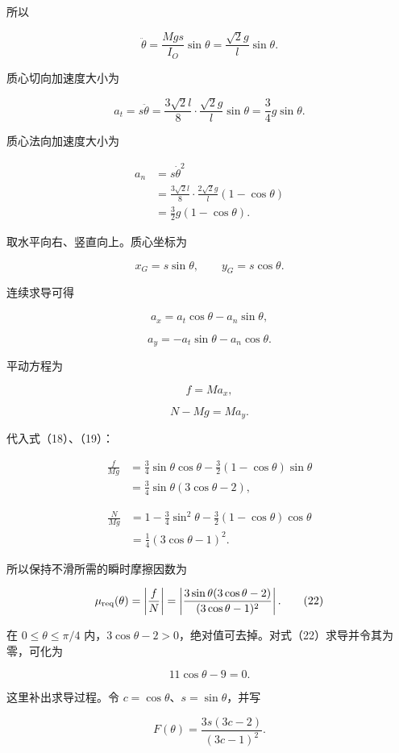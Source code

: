 \documentclass[12pt,a4paper,UTF8]{ctexart}
\begin{document}
所以

\[\ddot\theta
=\frac{Mgs}{I_O}\sin\theta
=\frac{\sqrt2g}{l}\sin\theta. \tag{17}\]

质心切向加速度大小为

\[a_t=s\ddot\theta
=\frac{3\sqrt2l}{8}\cdot\frac{\sqrt2g}{l}\sin\theta
=\frac34g\sin\theta. \tag{18}\]

质心法向加速度大小为

\[\begin{aligned}
a_n
&=s\dot\theta^2\\
&=\frac{3\sqrt2l}{8}\cdot
\frac{2\sqrt2g}{l}(1-\cos\theta)\\
&=\frac32g(1-\cos\theta).
\end{aligned} \tag{19}\]

取水平向右、竖直向上。质心坐标为

\[x_G=s\sin\theta,\qquad y_G=s\cos\theta.\]

连续求导可得

\[a_x=a_t\cos\theta-a_n\sin\theta,\]

\[a_y=-a_t\sin\theta-a_n\cos\theta.\]

平动方程为

\[f=Ma_x,\]

\[N-Mg=Ma_y.\]

代入式（18）、（19）：

\[\begin{aligned}
\frac{f}{Mg}
&=\frac34\sin\theta\cos\theta
-\frac32(1-\cos\theta)\sin\theta\\
&=\frac34\sin\theta(3\cos\theta-2),
\end{aligned} \tag{20}\]

\[\begin{aligned}
\frac{N}{Mg}
&=1-\frac34\sin^2\theta
-\frac32(1-\cos\theta)\cos\theta\\
&=\frac14(3\cos\theta-1)^2.
\end{aligned} \tag{21}\]

所以保持不滑所需的瞬时摩擦因数为

\[\mu_{\rm req}(\theta)
=\left|\frac fN\right|
=\left|\frac{3\sin\theta(3\cos\theta-2)}{(3\cos\theta-1)^2}\right|. \tag{22}\]

在 \(0\le\theta\le\pi/4\)
内，\(3\cos\theta-2>0\)，绝对值可去掉。对式（22）求导并令其为零，可化为

\[11\cos\theta-9=0. \tag{23}\]

这里补出求导过程。令 \(c=\cos\theta\)、\(s=\sin\theta\)，并写

\[F(\theta)=\frac{3s(3c-2)}{(3c-1)^2}.\]
\end{document}
